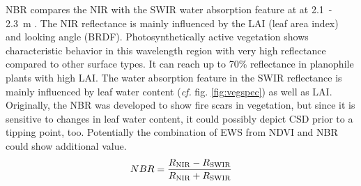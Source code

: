 NBR compares the NIR with the SWIR water absorption feature at at 2.1~- 2.3~\textmu m \citep[\textit{cf.} formula \ref{eq:nbr}, after][]{garcia1991}. The NIR reflectance is mainly influenced by the LAI (leaf area index) and looking angle (BRDF). Photosynthetically active vegetation shows characteristic behavior in this wavelength region with very high reflectance compared to other surface types. It can reach up to 70\% reflectance in planophile plants with high LAI. The water absorption feature in the SWIR reflectance is mainly influenced by leaf water content (\textit{cf.} fig. \ref{fig:vegspec}) as well as LAI. Originally, the NBR was developed to show fire scars in vegetation, but since it is sensitive to changes in leaf water content, it could possibly depict CSD prior to a tipping point, too. Potentially the combination of EWS from NDVI and NBR could show additional value.\\

\begin{equation}\label{eq:nbr}
	NBR = \frac{R\textsubscript{NIR} - R\textsubscript{SWIR}}{R\textsubscript{NIR} + R\textsubscript{SWIR}} 
\end{equation}\\




%
%
	

